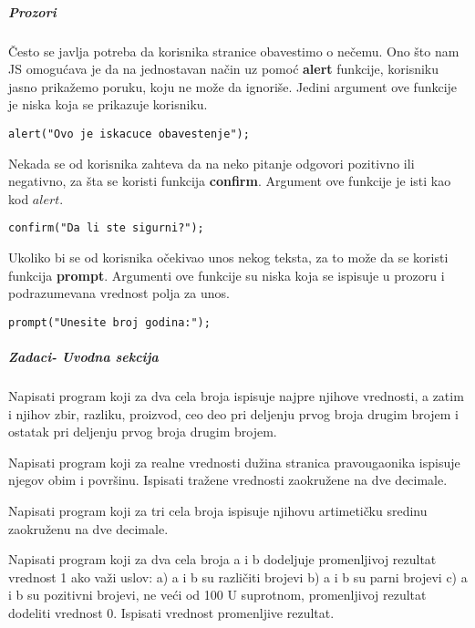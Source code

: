 \subparagraph{Prozori}
Često se javlja potreba da korisnika stranice obavestimo o nečemu. Ono što nam JS omogućava je da na jednostavan način uz pomoć \textbf{alert} funkcije, korisniku jasno prikažemo poruku, koju ne može da ignoriše. Jedini argument ove funkcije je niska koja se prikazuje korisniku. 
\begin{lstlisting}[backgroundcolor = \color{lightgray}, breaklines=true]
alert("Ovo je iskacuce obavestenje");
\end{lstlisting}
Nekada se od korisnika zahteva da na neko pitanje odgovori pozitivno ili negativno, za šta se koristi funkcija \textbf{confirm}. Argument ove funkcije je isti kao kod $alert$. 
\begin{lstlisting}[backgroundcolor = \color{lightgray}, breaklines=true]
confirm("Da li ste sigurni?");
\end{lstlisting}
Ukoliko bi se od korisnika očekivao unos nekog teksta, za to može da se koristi funkcija \textbf{prompt}. Argumenti ove funkcije su niska koja se ispisuje u prozoru i podrazumevana vrednost polja za unos. 
\begin{lstlisting}[backgroundcolor = \color{lightgray}, breaklines=true]
prompt("Unesite broj godina:");
\end{lstlisting}

\newpage
\subparagraph{Zadaci- Uvodna sekcija}

\begin{primer}
Napisati program koji za dva cela broja ispisuje najpre
njihove vrednosti, a zatim i njihov zbir, razliku, proizvod, ceo deo pri deljenju
prvog broja drugim brojem i ostatak pri deljenju prvog broja drugim brojem. 
\end{primer}


\begin{primer}
Napisati program koji za realne vrednosti dužina
stranica pravougaonika ispisuje njegov obim i površinu. Ispisati tražene vrednosti
zaokružene na dve decimale. 
\end{primer}

\begin{primer}
Napisati program koji za tri cela broja ispisuje
njihovu artimetičku sredinu zaokruženu na dve decimale.
\end{primer}

\begin{primer}
Napisati program koji za dva cela broja a i b dodeljuje
promenljivoj rezultat vrednost 1 ako važi uslov:
a) a i b su različiti brojevi
b) a i b su parni brojevi
c) a i b su pozitivni brojevi, ne veći od 100
U suprotnom, promenljivoj rezultat dodeliti vrednost 0. Ispisati vrednost promenljive
rezultat.
\end{primer}

